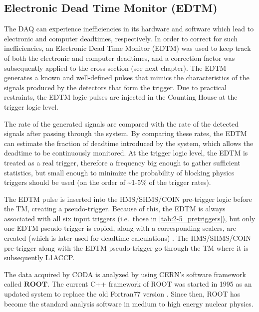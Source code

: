 \documentclass[
]{report}
\begin{document}
\hypertarget{electronic-dead-time-monitor-edtm}{%
\subsection{Electronic Dead Time Monitor
(EDTM)}\label{electronic-dead-time-monitor-edtm}}

The DAQ can experience inefficiencies in its hardware and software which
lead to electronic and computer deadtimes, respectively. In order to
correct for such inefficiencies, an Electronic Dead Time Monitor (EDTM)
was used to keep track of both the electronic and computer deadtimes,
and a correction factor was subsequently applied to the cross section
(see next chapter). The EDTM generates a known and well-defined pulses
that mimics the characteristics of the signals produced by the detectors
that form the trigger. Due to practical restraints, the EDTM logic
pulses are injected in the Counting House at the trigger logic level.

The rate of the generated signals are compared with the rate of the
detected signals after passing through the system. By comparing these
rates, the EDTM can estimate the fraction of deadtime introduced by the
system, which allows the deadtime to be continuously monitored. At the
trigger logic level, the EDTM is treated as a real trigger, therefore a
frequency big enough to gather sufficient statistics, but small enough
to minimize the probability of blocking physics triggers should be used
(on the order of \textasciitilde1-5\% of the trigger rates).

The EDTM pulse is inserted into the HMS/SHMS/COIN pre-trigger logic
before the TM, creating a pseudo-trigger. Because of this, the EDTM is
always associated with all six input triggers (i.e.~those in
\ref{tab:2-5_pretriggers}), but only one EDTM pseudo-trigger is copied,
along with a corresponding scalers, are created (which is later used for
deadtime calculations) \cite{murphy_private_2022}
\cite{murphy_graphical_2022}. The HMS/SHMS/COIN pre-trigger along with
the EDTM pseudo-trigger go through the TM where it is subsequently
L1ACCP.

\label{Chapter-5}

The data acquired by CODA is analyzed by using CERN's software framework
called \(\textbf{ROOT}\). The current C++ framework of ROOT was started
in 1995 as an updated system to replace the old Fortran77 version
\cite{brun_history_2011}. Since then, ROOT has become the standard
analysis software in medium to high energy nuclear physics.
\end{document}
